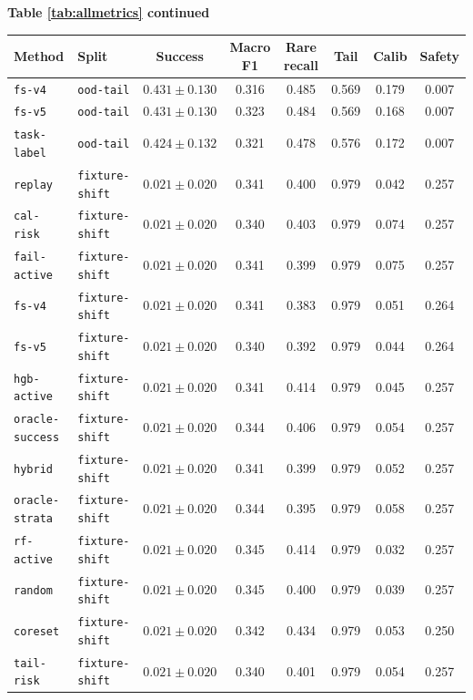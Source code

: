 \documentclass{article}
\begin{document}
\begin{center}
\textbf{Table \ref{tab:allmetrics} continued}\\[0.4ex]
\begin{tabular}{llcccccc}
\toprule
Method & Split & Success & Macro F1 & Rare recall & Tail & Calib & Safety \\
\midrule
\texttt{fs-v4} & \texttt{ood-tail} & $0.431 \pm 0.130$ & 0.316 & 0.485 & 0.569 & 0.179 & 0.007 \\
\texttt{fs-v5} & \texttt{ood-tail} & $0.431 \pm 0.130$ & 0.323 & 0.484 & 0.569 & 0.168 & 0.007 \\
\texttt{task-label} & \texttt{ood-tail} & $0.424 \pm 0.132$ & 0.321 & 0.478 & 0.576 & 0.172 & 0.007 \\
\texttt{replay} & \texttt{fixture-shift} & $0.021 \pm 0.020$ & 0.341 & 0.400 & 0.979 & 0.042 & 0.257 \\
\texttt{cal-risk} & \texttt{fixture-shift} & $0.021 \pm 0.020$ & 0.340 & 0.403 & 0.979 & 0.074 & 0.257 \\
\texttt{fail-active} & \texttt{fixture-shift} & $0.021 \pm 0.020$ & 0.341 & 0.399 & 0.979 & 0.075 & 0.257 \\
\texttt{fs-v4} & \texttt{fixture-shift} & $0.021 \pm 0.020$ & 0.341 & 0.383 & 0.979 & 0.051 & 0.264 \\
\texttt{fs-v5} & \texttt{fixture-shift} & $0.021 \pm 0.020$ & 0.340 & 0.392 & 0.979 & 0.044 & 0.264 \\
\texttt{hgb-active} & \texttt{fixture-shift} & $0.021 \pm 0.020$ & 0.341 & 0.414 & 0.979 & 0.045 & 0.257 \\
\texttt{oracle-success} & \texttt{fixture-shift} & $0.021 \pm 0.020$ & 0.344 & 0.406 & 0.979 & 0.054 & 0.257 \\
\texttt{hybrid} & \texttt{fixture-shift} & $0.021 \pm 0.020$ & 0.341 & 0.399 & 0.979 & 0.052 & 0.257 \\
\texttt{oracle-strata} & \texttt{fixture-shift} & $0.021 \pm 0.020$ & 0.344 & 0.395 & 0.979 & 0.058 & 0.257 \\
\texttt{rf-active} & \texttt{fixture-shift} & $0.021 \pm 0.020$ & 0.345 & 0.414 & 0.979 & 0.032 & 0.257 \\
\texttt{random} & \texttt{fixture-shift} & $0.021 \pm 0.020$ & 0.345 & 0.400 & 0.979 & 0.039 & 0.257 \\
\texttt{coreset} & \texttt{fixture-shift} & $0.021 \pm 0.020$ & 0.342 & 0.434 & 0.979 & 0.053 & 0.250 \\
\texttt{tail-risk} & \texttt{fixture-shift} & $0.021 \pm 0.020$ & 0.340 & 0.401 & 0.979 & 0.054 & 0.257 \\

\end{tabular}
\end{center}
\end{document}
